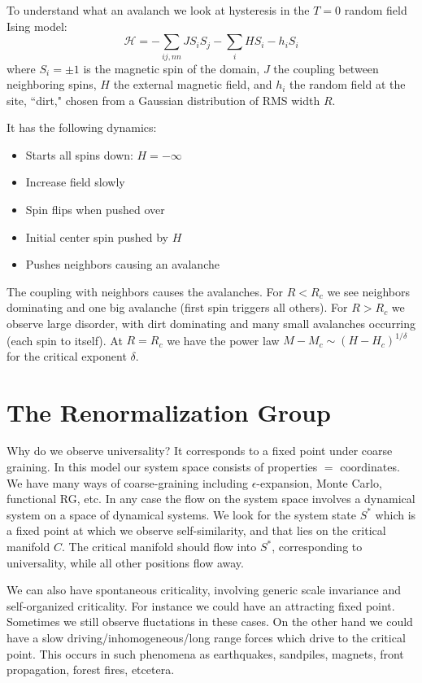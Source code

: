 \documentclass[12pt, a4paper, oneside, openright, titlepage]{book}
\begin{document}
To understand what an avalanch we look at hysteresis in the $T = 0$ random field Ising model: $$\mathcal{H} = -\sum_{ij, nn}JS_iS_j-\sum_iHS_i-h_iS_i$$
where $S_i = \pm 1$ is the magnetic spin of the domain, $J$ the coupling between neighboring spins, $H$ the external magnetic field, and $h_i$ the random field at the site, ``dirt," chosen from a Gaussian distribution of RMS width $R$.

It has the following dynamics: \begin{itemize}
    \item Starts all spins down: $H = -\infty$
    \item Increase field slowly 
    \item Spin flips when pushed over
    \item Initial center spin pushed by $H$
    \item Pushes neighbors causing an avalanche
\end{itemize}
The coupling with neighbors causes the avalanches. For $R < R_c$ we see neighbors dominating and one big avalanche (first spin triggers all others). For $R > R_c$ we observe large disorder, with dirt dominating and many small avalanches occurring (each spin to itself). At $R = R_c$ we have the power law $M-M_c \sim (H-H_c)^{1/\delta}$ for the critical exponent $\delta$.

\section{The Renormalization Group}

Why do we observe universality? It corresponds to a fixed point under coarse graining. In this model our system space consists of properties $=$ coordinates. We have many ways of coarse-graining including $\epsilon$-expansion, Monte Carlo, functional RG, etc. In any case the flow on the system space involves a dynamical system on a space of dynamical systems. We look for the system state $S^*$ which is a fixed point at which we observe self-similarity, and that lies on the critical manifold $C$. The critical manifold should flow into $S^*$, corresponding to universality, while all other positions flow away.

We can also have spontaneous criticality, involving generic scale invariance and self-organized criticality. For instance we could have an attracting fixed point. Sometimes we still observe fluctations in these cases. On the other hand we could have a slow driving/inhomogeneous/long range forces which drive to the critical point. This occurs in such phenomena as earthquakes, sandpiles, magnets, front propagation, forest fires, etcetera. 
\end{document}
